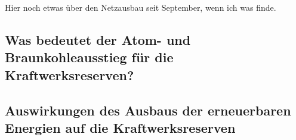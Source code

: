 		Hier noch etwas über den Netzausbau seit September, wenn ich was finde.
		
		
		
	
	\subsection{Was bedeutet der Atom- und Braunkohleausstieg für die Kraftwerksreserven?}
	
	
		
	\subsection{Auswirkungen des Ausbaus der erneuerbaren Energien auf die Kraftwerksreserven}